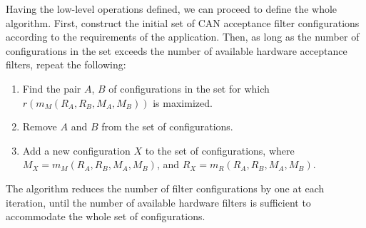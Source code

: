 \begin{remark}[breakable]
    Having the low-level operations defined, we can proceed to define the whole algorithm.
    First, construct the initial set of CAN acceptance filter configurations
    according to the requirements of the application.
    Then, as long as the number of configurations in the set exceeds the number of available
    hardware acceptance filters, repeat the following:
    \begin{enumerate}
        \item Find the pair $A$, $B$ of configurations in the set for which $r(m_M(R_A, R_B, M_A, M_B))$ is maximized.
        \item Remove $A$ and $B$ from the set of configurations.
        \item Add a new configuration $X$ to the set of configurations, where
        $M_X = m_M(R_A, R_B, M_A, M_B)$, and $R_X = m_R(R_A, R_B, M_A, M_B)$.
    \end{enumerate}

    The algorithm reduces the number of filter configurations by one at each iteration,
    until the number of available hardware filters is sufficient to accommodate the whole set of configurations.
\end{remark}
